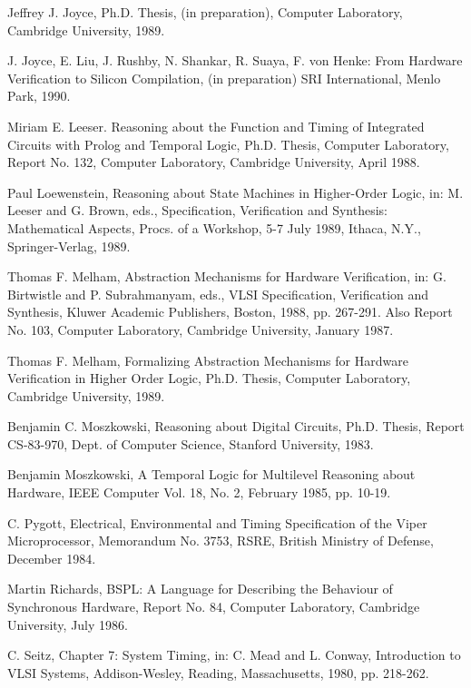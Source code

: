 \begin{thebibliography}{99}
Jeffrey J. Joyce,
Ph.D. Thesis,
(in preparation),
Computer Laboratory, Cambridge University,
1989.

J. Joyce, E. Liu, J. Rushby, N. Shankar, R. Suaya, F. von Henke:
From Hardware Verification to Silicon Compilation,
(in preparation)
SRI International, Menlo Park,
1990.

Miriam E. Leeser.
Reasoning about the Function and Timing of Integrated Circuits
with Prolog and Temporal Logic,
Ph.D. Thesis, Computer Laboratory,
Report No. 132, Computer Laboratory, Cambridge University,
April 1988.

Paul Loewenstein,
Reasoning about State Machines in Higher-Order Logic, in:
M. Leeser and G. Brown, eds.,
Specification, Verification and Synthesis:
Mathematical Aspects,
Procs. of a Workshop, 5-7 July 1989,
Ithaca, N.Y.,
Springer-Verlag,
1989.

Thomas F. Melham,
Abstraction Mechanisms for Hardware Verification, in:
G. Birtwistle and P. Subrahmanyam, eds.,
VLSI Specification, Verification and Synthesis,
Kluwer Academic Publishers, Boston, 1988,
pp. 267-291.
Also Report No. 103, Computer Laboratory, Cambridge University,
January 1987.

Thomas F. Melham,
Formalizing Abstraction Mechanisms for Hardware Verification in
Higher Order Logic,
Ph.D. Thesis,
Computer Laboratory, Cambridge University,
1989.

Benjamin C. Moszkowski,
Reasoning about Digital Circuits,
Ph.D. Thesis,
Report CS-83-970,
Dept. of Computer Science,
Stanford University,
1983.

Benjamin Moszkowski,
A Temporal Logic for Multilevel Reasoning about Hardware,
IEEE Computer Vol. 18, No. 2,
February 1985,
pp. 10-19.

C. Pygott,
Electrical, Environmental and Timing Specification of the Viper
Microprocessor,
Memorandum No. 3753,
RSRE,
British Ministry of Defense,
December 1984.

Martin Richards,
BSPL: A Language for Describing the Behaviour of Synchronous Hardware,
Report No. 84, Computer Laboratory,
Cambridge University,
July 1986.

C. Seitz,
Chapter 7: System Timing, in:
C. Mead and L. Conway,
Introduction to VLSI Systems,
Addison-Wesley,
Reading, Massachusetts, 1980,
pp. 218-262.


\end{thebibliography}
